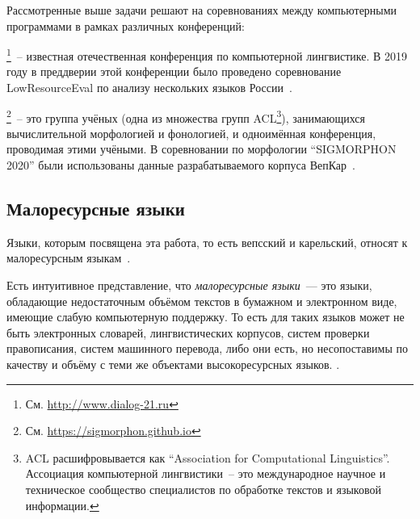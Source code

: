 Рассмотренные выше задачи решают на соревнованиях 
между компьютерными программами в рамках различных конференций:
\begin{description}[align=left]
    \item [Диалог]\footnote{См. \url{http://www.dialog-21.ru}}~-- 
            известная отечественная конференция 
            по компьютерной лингвистике.
            В 2019 году в преддверии этой конференции 
            было проведено соревнование LowResourceEval 
            по анализу нескольких языков России~\cite{Klyachko2019LowresourceEval}.

    \item [SIGMORPHON]\label{SIGMORPHON}\footnote{См. \url{https://sigmorphon.github.io}}~-- 
                это группа учёных (одна из множества групп ACL\footnote{%
                ACL расшифровывается как ``Association for Computational Linguistics''.
                Ассоциация компьютерной лингвистики~-- это 
                международное научное и техническое сообщество специалистов 
                по обработке текстов и языковой информации.
            }), 
            занимающихся вычислительной морфологией и фонологией, 
            и одноимённая конференция, проводимая этими учёными.
            В соревновании по морфологии ``SIGMORPHON 2020'' 
            были использованы данные 
            разрабатываемого корпуса ВепКар~\cite{Vylomova2020SIGMORPHON}.

\end{description}



\subsection{Малоресурсные языки}\label{sect_low-resource}

Языки, которым посвящена эта работа, то есть вепсский и карельский, 
относят к малоресурсным языкам~.

Есть интуитивное представление, что \emph{малоресурсные языки}~--- 
это языки, обладающие недостаточным объёмом текстов 
в бумажном и электронном виде, 
имеющие слабую компьютерную поддержку. 
То есть для таких языков может не быть 
электронных словарей, лингвистических корпусов, 
систем проверки правописания, систем машинного перевода, 
либо они есть, но несопоставимы по качеству и объёму с теми же объектами  
высокоресурсных языков.
.

